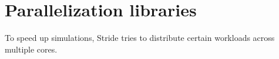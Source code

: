   
\chapter{Parallelization libraries}

To speed up simulations, Stride tries to distribute certain workloads across multiple cores. 